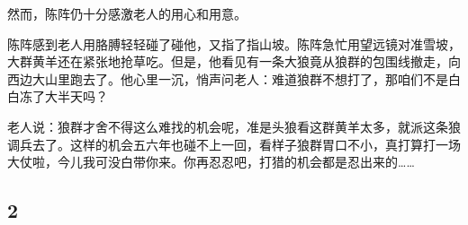 \par 然而，陈阵仍十分感激老人的用心和用意。
\par 陈阵感到老人用胳膊轻轻碰了碰他，又指了指山坡。陈阵急忙用望远镜对准雪坡，大群黄羊还在紧张地抢草吃。但是，他看见有一条大狼竟从狼群的包围线撤走，向西边大山里跑去了。他心里一沉，悄声问老人：难道狼群不想打了，那咱们不是白白冻了大半天吗？
\par 老人说：狼群才舍不得这么难找的机会呢，准是头狼看这群黄羊太多，就派这条狼调兵去了。这样的机会五六年也碰不上一回，看样子狼群胃口不小，真打算打一场大仗啦，今儿我可没白带你来。你再忍忍吧，打猎的机会都是忍出来的……






\subsection*{2}

